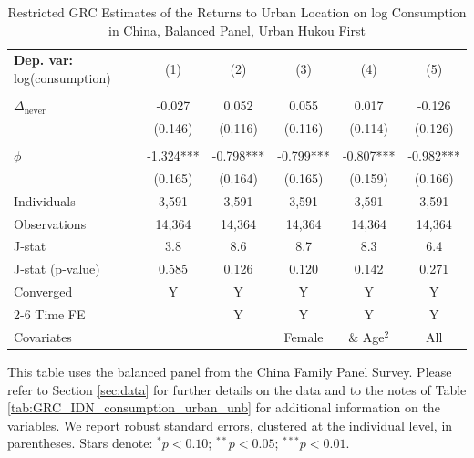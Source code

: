 \begin{table}[htbp] \centering \begin{threeparttable}
 \caption{Restricted GRC Estimates of the Returns to Urban Location on log Consumption in China, Balanced Panel, Urban Hukou First} 
 \label{tab:GRC_CHN_urban_first_consumption_urban_bal} 
\begin{tabular}{l ccccc} \toprule  \textbf{Dep. var:}  log(consumption) 
                    &\multicolumn{1}{c}{(1)}   &\multicolumn{1}{c}{(2)}   &\multicolumn{1}{c}{(3)}   &\multicolumn{1}{c}{(4)}   &\multicolumn{1}{c}{(5)}   \\
                    &               &               &               &               &               \\
\addlinespace
$\Delta_{\text{never}}$&      -0.027   &       0.052   &       0.055   &       0.017   &      -0.126   \\
                    &     (0.146)   &     (0.116)   &     (0.116)   &     (0.114)   &     (0.126)   \\
                    &               &               &               &               &               \\
\addlinespace
$\phi$              &      -1.324***&      -0.798***&      -0.799***&      -0.807***&      -0.982***\\
                    &     (0.165)   &     (0.164)   &     (0.165)   &     (0.159)   &     (0.166)   \\
\addlinespace
Individuals         &       3,591   &       3,591   &       3,591   &       3,591   &       3,591   \\
Observations        &      14,364   &      14,364   &      14,364   &      14,364   &      14,364   \\
J-stat              &         3.8   &         8.6   &         8.7   &         8.3   &         6.4   \\
J-stat (p-value)    &       0.585   &       0.126   &       0.120   &       0.142   &       0.271   \\
Converged           &           Y   &           Y   &           Y   &           Y   &           Y   \\
\cmidrule{2-6} Time FE & & Y & Y & Y & Y \\ Covariates & & & Female & \& Age$^2$ & All \\ \bottomrule \end{tabular} \begin{tablenotes}[flushleft] \footnotesize \item{This table uses the balanced panel from the China Family Panel Survey. Please refer to Section \ref{sec:data} for further details on the data and to the notes of Table \ref{tab:GRC_IDN_consumption_urban_unb} for additional information on the variables. We report robust standard errors, clustered at the individual level, in parentheses. Stars denote: $^{*} p<0.10$; $^{**} p<0.05$; $^{***} p<0.01$.} \end{tablenotes} \end{threeparttable} \end{table}
